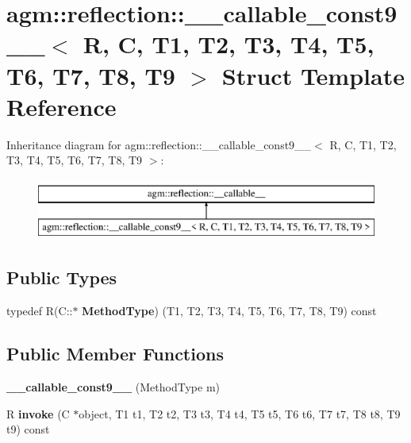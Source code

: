 \hypertarget{structagm_1_1reflection_1_1____callable__const9____}{}\section{agm\+:\+:reflection\+:\+:\+\_\+\+\_\+callable\+\_\+const9\+\_\+\+\_\+$<$ R, C, T1, T2, T3, T4, T5, T6, T7, T8, T9 $>$ Struct Template Reference}
\label{structagm_1_1reflection_1_1____callable__const9____}
Inheritance diagram for agm\+:\+:reflection\+:\+:\+\_\+\+\_\+callable\+\_\+const9\+\_\+\+\_\+$<$ R, C, T1, T2, T3, T4, T5, T6, T7, T8, T9 $>$\+:\begin{figure}[H]
\begin{center}
\leavevmode
\includegraphics[height=2.000000cm]{structagm_1_1reflection_1_1____callable__const9____}
\end{center}
\end{figure}
\subsection*{Public Types}
\begin{DoxyCompactItemize}
\item 
typedef R(C\+::$\ast$ {\bfseries Method\+Type}) (T1, T2, T3, T4, T5, T6, T7, T8, T9) const \hypertarget{structagm_1_1reflection_1_1____callable__const9_____ade116f527bfa45f0a6d68823f7b9803e}{}\label{structagm_1_1reflection_1_1____callable__const9_____ade116f527bfa45f0a6d68823f7b9803e}

\end{DoxyCompactItemize}
\subsection*{Public Member Functions}
\begin{DoxyCompactItemize}
\item 
{\bfseries \+\_\+\+\_\+callable\+\_\+const9\+\_\+\+\_\+} (Method\+Type m)\hypertarget{structagm_1_1reflection_1_1____callable__const9_____a6edb128d9edc07aebf2bee8f71946b16}{}\label{structagm_1_1reflection_1_1____callable__const9_____a6edb128d9edc07aebf2bee8f71946b16}

\item 
R {\bfseries invoke} (C $\ast$object, T1 t1, T2 t2, T3 t3, T4 t4, T5 t5, T6 t6, T7 t7, T8 t8, T9 t9) const \hypertarget{structagm_1_1reflection_1_1____callable__const9_____aa4090d07c9c630895ba0f3c0cb3b91f2}{}\label{structagm_1_1reflection_1_1____callable__const9_____aa4090d07c9c630895ba0f3c0cb3b91f2}

\end{DoxyCompactItemize}
